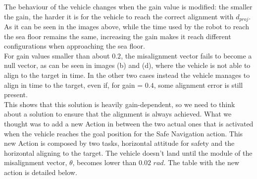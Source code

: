 \documentclass{article}
\begin{document}
\begin{figure}[H]
	\centering
	\hspace{10mm}
	\label{im:v_land_gain0_7}
\end{figure} 
The behaviour of the vehicle changes when the gain value is modified: the smaller the gain, the harder it is for the vehicle to reach the correct alignment with \(d_{proj}\). As it can be seen in the images above, while the time used by the robot to reach the sea floor remains the same, increasing the gain makes it reach different configurations when approaching the sea floor.\\
For gain values smaller than about \(0.2\), the misalignment vector fails to become a null vector, as can be seen in images (b) and (d), where the vehicle is not able to align to the target in time. In the other two cases instead the vehicle manages to align in time to the target, even if, for gain = \(0.4\), some alignment error is still present. \\
This shows that this solution is heavily gain-dependent, so we need to think about a solution to ensure that the alignment is always achieved.
What we thought was to add a new Action in between the two actual ones that is activated when the vehicle reaches the goal position for the Safe Navigation action. This new Action is composed by two tasks, horizontal attitude for safety and the horizontal aligning to the target. The vehicle doesn't land until the module of the misalignment vector, $\theta$, becomes lower than \(0.02 \) \({rad}\). The table with the new action is detailed below. \\
\end{document}
